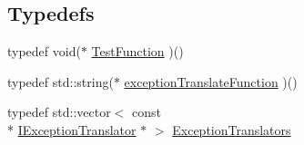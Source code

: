 \subsection*{Typedefs}
\begin{DoxyCompactItemize}
\item 
typedef void($\ast$ \hyperlink{namespace_catch_a768da872b9033e4c71c6f316393d35db}{Test\-Function} )()
\item 
typedef std\-::string($\ast$ \hyperlink{namespace_catch_ae1727c8cadfc5ad8b43dff651cd2f8b0}{exception\-Translate\-Function} )()
\item 
typedef std\-::vector$<$ const \\*
\hyperlink{struct_catch_1_1_i_exception_translator}{I\-Exception\-Translator} $\ast$ $>$ \hyperlink{namespace_catch_ae0442a3627f91437716106138b5f540b}{Exception\-Translators}
\end{DoxyCompactItemize}
